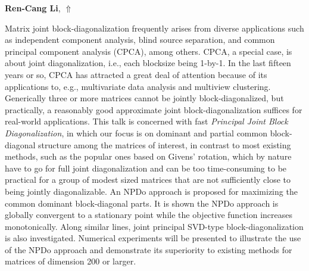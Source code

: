 \documentclass[ILAS2025-program.tex]{subfiles}
\begin{document}
\hypertarget{down0008}{}\begin{ilasabstract}
    
\textbf{Ren-Cang Li},  \hfill \hyperlink{up0008}{$\Uparrow$}
    
    
\mtskip
    Matrix joint block-diagonalization frequently arises from diverse applications such as
independent component analysis, blind source separation, and common principal component analysis (CPCA),
among others. CPCA, a special case, is about joint diagonalization, i.e.,
each blocksize being 1-by-1. In the last fifteen years or so, CPCA has attracted a great deal of attention because
of its applications to, e.g., multivariate data analysis and multiview  clustering.
Generically three or more matrices cannot be jointly block-diagonalized, but practically,
a reasonably good approximate joint block-diagonalization suffices  for
real-world applications. This talk is concerned with fast  {\em Principal Joint Block Diagonalization\/}, in which
our focus is on dominant and partial common block-diagonal structure among the 
matrices of interest, in contrast to most existing methods, such as the popular ones based on Givens' rotation,
which by nature have to go for full joint diagonalization and can be too time-consuming to be practical for a group of modest sized matrices
that are not sufficiently close to being jointly diagonalizable.
An NPDo approach is proposed for maximizing the common dominant block-diagonal parts.
It is shown the NPDo approach is globally convergent to a stationary point
while the objective function increases monotonically. Along similar lines,
joint principal SVD-type block-diagonalization is also investigated.
Numerical experiments will be presented to illustrate the use of the NPDo approach and demonstrate its superiority
to existing methods for matrices of dimension 200 or larger.

\end{ilasabstract}
    
\end{document}
